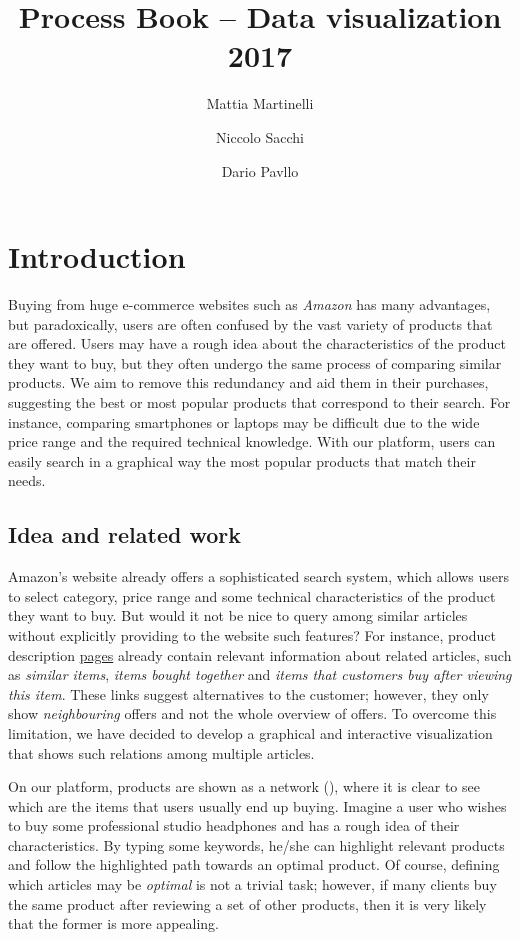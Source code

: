 \documentclass[a4paper,12pt]{article}
\title{Process Book -- Data visualization 2017}
\author{Mattia Martinelli \and Niccolo Sacchi \and Dario Pavllo}
\date{} %
\begin{document}
\maketitle
{
	\hypersetup{linkcolor=black}
	\tableofcontents
}

\newpage
\section{Introduction}
\label{sec:introduction}
Buying from huge e-commerce websites such as \emph{Amazon} has many advantages, but paradoxically, users are often confused by the vast variety of products that are offered. Users may have a rough idea about the characteristics of the product they want to buy, but they often undergo the same process of comparing similar products. We aim to remove this redundancy and aid them in their purchases, suggesting the best or most popular products that correspond to their search. For instance, comparing smartphones or laptops may be difficult due to the wide price range and the required technical knowledge. With our platform, users can easily search in a graphical way the most popular products that match their needs.

\subsection{Idea and related work}
Amazon's website already offers a sophisticated search system, which allows users to select category, price range and some technical characteristics of the product they want to buy. But would it not be nice to query among similar articles without explicitly providing to the website such features? For instance, product description  \href{https://www.amazon.com/Acer-E5-575-33BM-15-6-Inch-Notebook-Generation/dp/B01K1IO3QW/ref=sr_1_3?s=pc&ie=UTF8&qid=1512207600&sr=1-3&keywords=laptop}{pages} already contain relevant information about related articles, such as \textit{similar items}, \textit{items bought together} and \textit{items that customers buy after viewing this item}. These links suggest alternatives to the customer; however, they only show \textit{neighbouring} offers and not the whole overview of offers. To overcome this limitation, we have decided to develop a graphical and interactive visualization that shows such relations among multiple articles.

On our platform, products are shown as a network (), where it is clear to see which are the items that users usually end up buying. Imagine a user who wishes to buy some professional studio headphones and has a rough idea of their characteristics. By typing some keywords, he/she can highlight relevant products and follow the highlighted path towards an optimal product. Of course, defining which articles may be \emph{optimal} is not a trivial task; however, if many clients buy the same product after reviewing a set of other products, then it is very likely that the former is more appealing. 
\end{document}
